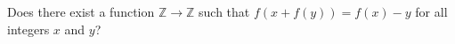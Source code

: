 \documentclass[varwidth]{standalone}
\begin{document}
    Does there exist a function $\mathbb{Z} \to \mathbb{Z}$ such that $f(x + f(y)) = f(x) - y$ for all integers $x$ and $y$?
\end{document}
